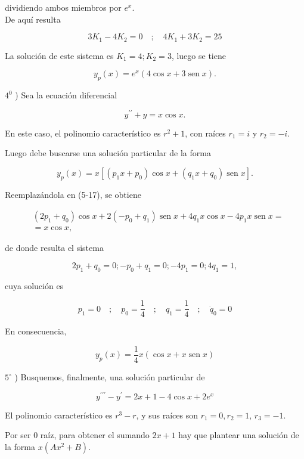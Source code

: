 \documentclass[10pt]{article}
\theoremstyle{plain}
\theoremstyle{definition}
\theoremstyle{remark}
\begin{document}
dividiendo ambos miembros por $e^{x}$.\\
De aquí resulta

$$
3 K_{1}-4 K_{2}=0 \quad ; \quad 4 K_{1}+3 K_{2}=25
$$

La solución de este sistema es $K_{1}=4 ; K_{2}=3$, luego se tiene

$$
y_{p}(x)=e^{x}(4 \cos x+3 \operatorname{sen} x) .
$$

$4^{0}$ ) Sea la ecuación diferencial


\begin{equation*}
y^{\prime \prime}+y=x \cos x . \tag{5-17}
\end{equation*}


En este caso, el polinomio característico es $r^{2}+1$, con raíces $r_{1}=i$ y $r_{2}=-i$.

Luego debe buscarse una solución particular de la forma

$$
y_{p}(x)=x\left[\left(p_{1} x+p_{0}\right) \cos x+\left(q_{1} x+q_{0}\right) \operatorname{sen} x\right] .
$$

Reemplazándola en (5-17), se obtiene

$$
\begin{aligned}
& \left(2 p_{1}+q_{0}\right) \cos x+2\left(-p_{0}+q_{1}\right) \operatorname{sen} x+4 q_{1} x \cos x-4 p_{1} x \operatorname{sen} x= \\
& =x \cos x,
\end{aligned}
$$

de donde resulta el sistema

$$
2 p_{1}+q_{0}=0 ;-p_{0}+q_{1}=0 ;-4 p_{1}=0 ; 4 q_{1}=1,
$$

cuya solución es

$$
p_{1}=0 \quad ; \quad p_{0}=\frac{1}{4} \quad ; \quad q_{1}=\frac{1}{4} \quad ; \quad \dot{q}_{0}=0
$$

En consecuencia,

$$
y_{p}(x)=\frac{1}{4} x(\cos x+x \operatorname{sen} x)
$$

$5^{\circ}$ ) Busquemos, finalmente, una solución particular de


\begin{equation*}
y^{\prime \prime \prime}-y^{\prime}=2 x+1-4 \cos x+2 e^{x} \tag{5-18}
\end{equation*}


El polinomio característico es $r^{3}-r$, y sus raíces son $r_{1}=0, r_{2}=1$, $r_{3}=-1$.

Por ser 0 raíz, para obtener el sumando $2 x+1$ hay que plantear una solución de la forma $x\left(A x^{2}+B\right)$.
\end{document}
